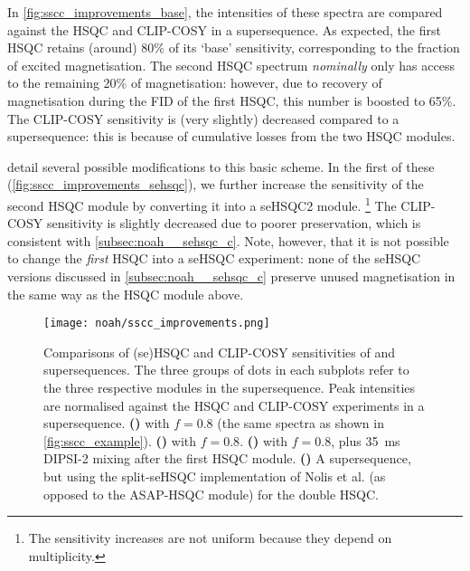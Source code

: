In \cref{fig:sscc_improvements_base}, the intensities of these spectra are compared against the HSQC and CLIP-COSY in a  supersequence.
As expected, the first HSQC retains (around) 80\% of its `base' sensitivity, corresponding to the fraction of excited magnetisation.
The second HSQC spectrum \textit{nominally} only has access to the remaining 20\% of magnetisation: however, due to recovery of  magnetisation during the FID of the first HSQC, this number is boosted to 65\%.
The CLIP-COSY sensitivity is (very slightly) decreased compared to a  supersequence: this is because of cumulative losses from the two HSQC modules.

 detail several possible modifications to this basic scheme.
In the first of these (\cref{fig:sscc_improvements_sehsqc}), we further increase the sensitivity of the second HSQC module by converting it into a seHSQC2 module.%
\footnote{The sensitivity increases are not uniform because they depend on multiplicity.}
The CLIP-COSY sensitivity is slightly decreased due to poorer  preservation, which is consistent with \cref{subsec:noah__sehsqc_c}.
Note, however, that it is not possible to change the \textit{first} HSQC into a seHSQC experiment: none of the seHSQC versions discussed in \cref{subsec:noah__sehsqc_c} preserve unused  magnetisation in the same way as the HSQC module above.

\begin{figure}[!ht]
    \centering
    \texttt{[image: noah/sscc\_improvements.png]}%
    {\label{fig:sscc_improvements_base}}%
    {\label{fig:sscc_improvements_sehsqc}}%
    {\label{fig:sscc_improvements_dipsi}}%
    {\label{fig:sscc_improvements_split_sehsqc}}%
    \caption[Sensitivity comparisons for  and  supersequences]{
        Comparisons of (se)HSQC and CLIP-COSY sensitivities of  and  supersequences.
        The three groups of dots in each subplots refer to the three respective modules in the supersequence.
        Peak intensities are normalised against the HSQC and CLIP-COSY experiments in a  supersequence.
        \textbf{()}  with $f = 0.8$ (the same spectra as shown in \cref{fig:sscc_example}).
        \textbf{()}  with $f = 0.8$.
        \textbf{()}  with $f = 0.8$, plus \qty{35}{\ms} DIPSI-2 mixing after the first HSQC module.
        \textbf{()} A  supersequence, but using the split-seHSQC implementation of Nolis et al.\autocite{Nolis2019CPC} (as opposed to the ASAP-HSQC module) for the double HSQC.
    }
    \label{fig:sscc_improvements}
\end{figure}

